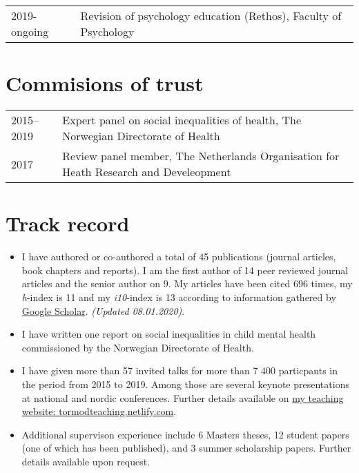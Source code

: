 \documentclass[11pt,a4paper,a4paper]{article}
\providecommand{\tightlist}{%
  \setlength{\itemsep}{0pt}\setlength{\parskip}{0pt}}
\newcounter{papers}
\begin{document}
\begin{tabular}{ll}
  2019-ongoing & Revision of psychology education (Rethos), Faculty of Psychology \\ 
  \end{tabular}

\hypertarget{commisions-of-trust}{%
\section{Commisions of trust}\label{commisions-of-trust}}

\begin{tabular}{ll}
  2015--2019 & Expert panel on social inequalities of health, The Norwegian Directorate of Health \\ 
  2017 & Review panel member, The Netherlands Organisation for Heath Research and Develeopment \\ 
  \end{tabular}

\hypertarget{track-record}{%
\section{Track record}\label{track-record}}

\begin{itemize}
\tightlist
\item
  I have authored or co-authored a total of 45 publications (journal articles, book chapters and reports). I am the first author of 14 peer reviewed journal articles and the senior author on 9. My articles have been cited 696 times, my \emph{h}-index is 11 and my \emph{i10}-index is 13 according to information gathered by \href{https://scholar.google.com/citations?user=TMC38ZgAAAAJ\&hl=en}{Google Scholar}. \emph{(Updated 08.01.2020)}.
\item
  I have written one report on social inequalities in child mental health commissioned by the Norwegian Directorate of Health.
\item
  I have given more than 57 invited talks for more than 7 400 particpants in the period from 2015 to 2019. Among those are several keynote presentations at national and nordic conferences. Further details available on \href{https://tormodteaching.netlify.com/appendd.html}{my teaching website: tormodteaching.netlify.com}.
\item
  Additional supervison experience include 6 Masters theses, 12 student papers (one of which has been published), and 3 summer scholarship papers. Further details available upon request.
\end{itemize}
\end{document}
